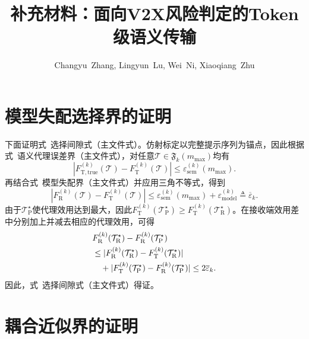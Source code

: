 \documentclass[journal]{IEEEtran}
\begin{document}
\title{补充材料：面向V2X风险判定的Token级语义传输}
\author{Changyu~Zhang, Lingyun~Lu, Wei~Ni, Xiaoqiang~Zhu}
\maketitle

\appendix
\section{模型失配选择界的证明}
\label{app:proxy}

下面证明式~选择间隙式（主文件式）。仿射标定以完整提示序列为锚点，因此根据式~语义代理误差界（主文件式），对任意$\mathcal T\in\mathfrak F_k(m_{\max})$均有
\begin{equation}
|F_{\mathrm T,\mathrm{true}}^{(k)}(\mathcal T)
-F_{\mathrm T}^{(k)}(\mathcal T)|
\leq\varepsilon_{\mathrm{sem}}^{(k)}(m_{\max}).
\end{equation}
再结合式~模型失配界（主文件式）并应用三角不等式，得到
\begin{equation}
|F_{\mathrm R}^{(k)}(\mathcal T)-F_{\mathrm T}^{(k)}(\mathcal T)|
\leq\varepsilon_{\mathrm{sem}}^{(k)}(m_{\max})
+\varepsilon_{\mathrm{model}}^{(k)}
\triangleq\overline\varepsilon_k.
\end{equation}
由于$\mathcal T_{\mathrm P}^{\star}$使代理效用达到最大，因此$F_{\mathrm T}^{(k)}(\mathcal T_{\mathrm P}^{\star})\geq F_{\mathrm T}^{(k)}(\mathcal T_{\mathrm R}^{\star})$。在接收端效用差中分别加上并减去相应的代理效用，可得
\begin{align}
&F_{\mathrm R}^{(k)}(\mathcal T_{\mathrm R}^{\star})
-F_{\mathrm R}^{(k)}(\mathcal T_{\mathrm P}^{\star})
\notag\\
&\leq
|F_{\mathrm R}^{(k)}(\mathcal T_{\mathrm R}^{\star})
-F_{\mathrm T}^{(k)}(\mathcal T_{\mathrm R}^{\star})|
\notag\\
&\quad+
|F_{\mathrm T}^{(k)}(\mathcal T_{\mathrm P}^{\star})
-F_{\mathrm R}^{(k)}(\mathcal T_{\mathrm P}^{\star})|
\leq2\overline\varepsilon_k.
\end{align}
因此，式~选择间隙式（主文件式）得证。

\section{耦合近似界的证明}
\label{app:coupling}
\end{document}
